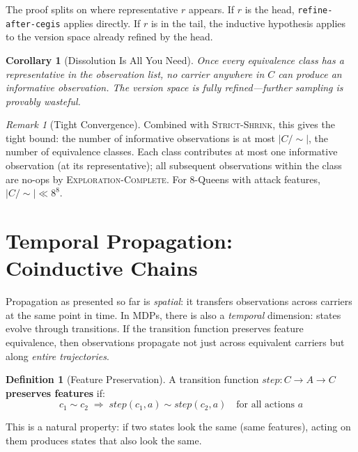 \documentclass[9pt,a4paper]{article}
\theoremstyle{plain}
\newtheorem{corollary}[theorem]{Corollary}
\theoremstyle{definition}
\newtheorem{definition}{Definition}
\theoremstyle{remark}
\newtheorem{remark}{Remark}
\begin{document}
\noindent The proof splits on where representative $r$ appears.  If $r$ is the head, \texttt{refine-after-cegis} applies directly.  If $r$ is in the tail, the inductive hypothesis applies to the version space already refined by the head.

\begin{corollary}[Dissolution Is All You Need]
Once every equivalence class has a representative in the observation list, no carrier anywhere in $C$ can produce an informative observation.  The version space is \emph{fully refined}---further sampling is provably wasteful.
\end{corollary}

\begin{remark}[Tight Convergence]
Combined with \textsc{Strict-Shrink}, this gives the tight bound: the number of informative observations is at most $|C/{\sim}|$, the number of equivalence classes.  Each class contributes at most one informative observation (at its representative); all subsequent observations within the class are no-ops by \textsc{Exploration-Complete}.  For 8-Queens with attack features, $|C/{\sim}| \ll 8^8$.
\end{remark}



\section{Temporal Propagation: Coinductive Chains}
\label{sec:temporal}

Propagation as presented so far is \emph{spatial}: it transfers observations across carriers at the same point in time.  In MDPs, there is also a \emph{temporal} dimension: states evolve through transitions.  If the transition function preserves feature equivalence, then observations propagate not just across equivalent carriers but along \emph{entire trajectories}.

\begin{definition}[Feature Preservation]
A transition function $\mathit{step} : C \to A \to C$ \textbf{preserves features} if:
\[
c_1 \sim c_2 \;\Longrightarrow\; \mathit{step}(c_1, a) \sim \mathit{step}(c_2, a) \quad \text{for all actions } a
\]
\end{definition}

\noindent This is a natural property: if two states look the same (same features), acting on them produces states that also look the same.
\end{document}
